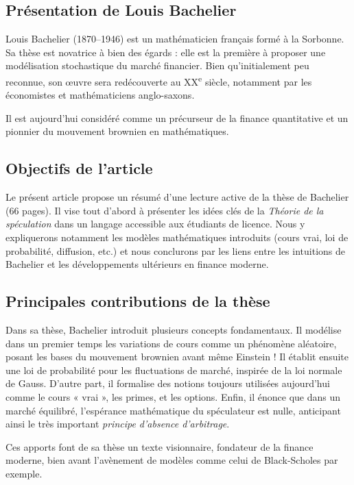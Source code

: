 \documentclass[12pt,a4paper]{article}
\begin{document}
\subsection{Présentation de Louis Bachelier}

Louis Bachelier (1870–1946) est un mathématicien français formé à la Sorbonne. Sa thèse est novatrice à bien des égards : elle est la première à proposer une modélisation stochastique du marché financier. Bien qu’initialement peu reconnue, son œuvre sera redécouverte au XX\textsuperscript{e} siècle, notamment par les économistes et mathématiciens anglo-saxons.

Il est aujourd’hui considéré comme un précurseur de la finance quantitative et un pionnier du mouvement brownien en mathématiques.

\subsection{Objectifs de l'article}

Le présent article propose un résumé d'une lecture active de la thèse de Bachelier (66 pages). Il vise tout d'abord à présenter les idées clés de la \textit{Théorie de la spéculation} dans un langage accessible aux étudiants de licence. Nous y expliquerons notamment les modèles mathématiques introduits (cours vrai, loi de probabilité, diffusion, etc.) et nous conclurons par les liens entre les intuitions de Bachelier et les développements ultérieurs en finance moderne.

\subsection{Principales contributions de la thèse}

Dans sa thèse, Bachelier introduit plusieurs concepts fondamentaux. Il modélise dans un premier temps les variations de cours comme un phénomène aléatoire, posant les bases du mouvement brownien avant même Einstein ! Il établit ensuite une loi de probabilité pour les fluctuations de marché, inspirée de la loi normale de Gauss. D'autre part, il formalise des notions toujours utilisées aujourd’hui comme le cours « vrai », les primes, et les options. Enfin, il énonce que dans un marché équilibré, l’espérance mathématique du spéculateur est nulle, anticipant ainsi le très important \textit{principe d’absence d’arbitrage}.

Ces apports font de sa thèse un texte visionnaire, fondateur de la finance moderne, bien avant l’avènement de modèles comme celui de Black-Scholes par exemple.
\end{document}
